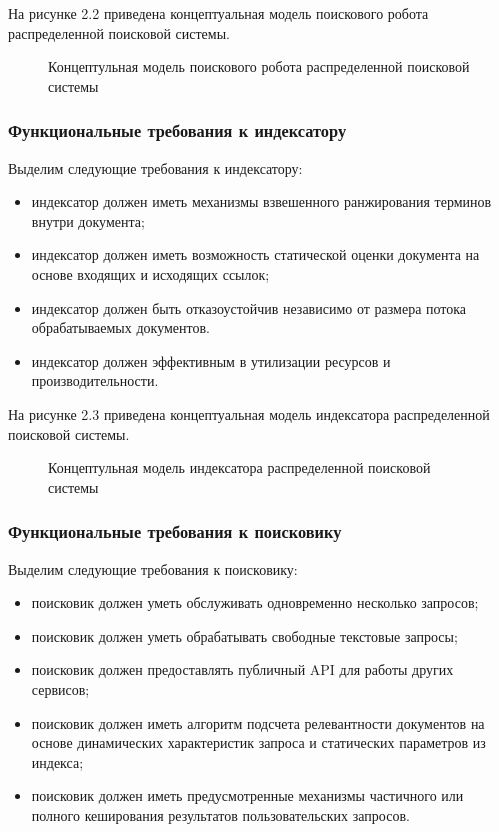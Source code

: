 На рисунке 2.2 приведена концептуальная модель поискового робота распределенной поисковой системы.

\begin{figure}
\caption{Концептульная модель поискового робота распределенной поисковой системы}
\label{concept_robot_model:image}
\end{figure}

\subsubsection{Функциональные требования к индексатору}
Выделим следующие требования к индексатору:
\begin{itemize}
\item индексатор должен иметь механизмы взвешенного ранжирования терминов внутри документа;
\item индексатор должен иметь возможность статической оценки документа на основе входящих и исходящих ссылок;
\item индексатор должен быть отказоустойчив независимо от размера потока обрабатываемых документов.
\item индексатор должен эффективным в утилизации ресурсов и производительности.
\end{itemize}

На рисунке 2.3 приведена концептуальная модель индексатора распределенной поисковой системы.

\begin{figure}
\caption{Концептульная модель индексатора распределенной поисковой системы}
\label{concept_indexer_model:image}
\end{figure}

\subsubsection{Функциональные требования к поисковику}
Выделим следующие требования к поисковику:
\begin{itemize}
\item поисковик должен уметь обслуживать одновременно несколько запросов;
\item поисковик должен уметь обрабатывать свободные текстовые запросы;
\item поисковик должен предоставлять публичный API для работы других сервисов;
\item поисковик должен иметь алгоритм подсчета релевантности документов на основе динамических характеристик запроса и статических параметров из индекса;
\item поисковик должен иметь предусмотренные механизмы частичного или полного кеширования результатов пользовательских запросов.
\end{itemize}

